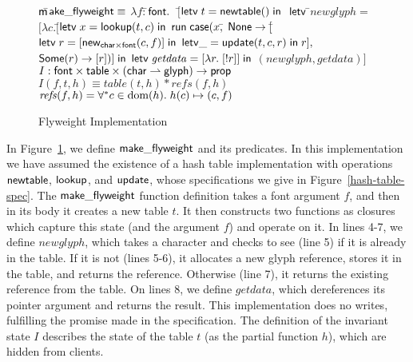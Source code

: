 \begin{figure}
\begin{specification}
\nextline $\mathsf{m}$\=$\mathsf{ake\_flyweight} \equiv$ 
\nextline            \> $\lambda f:$\=$\mathsf{font}.\;$
\nextline \> $[$\=$\mathsf{letv}\;t = \mathsf{newtable}()\;\mathsf{in}\;$ 
\nextline \> \> $\mathsf{letv\;}$\=$\mathit{newglyph} =$ 
\nextline \> \> \> \!\!$[\lambda c.[$\=$\mathsf{letv}\; x = \mathsf{lookup}(t, c)\;\mathsf{in}$
\nextline \> \>\>\> $\mathsf{run}\;\mathsf{case}(x,$\=
$\mathsf{None} \to [$\=$\mathsf{letv}\; r = [\mathsf{new}_{\mathsf{char} \times \mathsf{font}}(c,f)] \;\mathsf{in}$
\nextline \> \>\>\>\>\> $\mathsf{letv } \_ = \mathsf{update}(t, c, r) \;\mathsf{ in }\;r],$ 
\nextline \> \>\>\>\> $\mathsf{Some}(r) \to [r])] \;\mathsf{in}$ 
\nextline \> \> $\mathsf{letv\;}\mathit{getdata} = [\lambda r.\; [!r]] \;\mathsf{in}$ 
\nextline \> \> $(\mathit{newglyph}, \mathit{getdata})]$
\\

\nextline $I : \mathsf{font} \times \mathsf{table} \times (\mathsf{char} \rightharpoonup \mathsf{glyph}) \to \mathsf{prop}$ 
\nextline $I(f, t, h) \equiv table(t,h) * \mathit{refs}(f, h)$ \\
\nextline $\mathit{refs}(f, h) = \forall^{*} c \in \mbox{dom}({h}).\; h(c) \mapsto (c, f)$ 
\end{specification}
\caption{Flyweight Implementation}
\label{flyweight-impl}
\end{figure}

In Figure~\ref{flyweight-impl}, we define $\mathsf{make\_flyweight}$
and its predicates. In this implementation we have assumed the
existence of a hash table implementation with operations
$\mathsf{newtable}$, $\mathsf{lookup}$, and $\mathsf{update}$, whose
specifications we give in Figure~\ref{hash-table-spec}. The
$\mathsf{make\_flyweight}$ function definition takes a font argument
$f$, and then in its body it creates a new table $t$. It then
constructs two functions as closures which capture this state (and the
argument $f$) and operate on it. In lines 4-7, we define $newglyph$,
which takes a character and checks to see (line 5) if it is already in
the table. If it is not (lines 5-6), it allocates a new glyph
reference, stores it in the table, and returns the
reference. Otherwise (line 7), it returns the existing reference from
the table.  On lines 8, we define $getdata$, which dereferences its
pointer argument and returns the result. This implementation does no
writes, fulfilling the promise made in the specification. The
definition of the invariant state $I$ describes the state of the table
$t$ (as the partial function $h$), which are hidden from clients.

